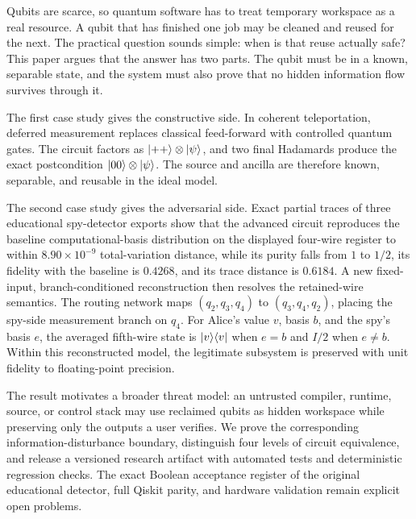 Qubits are scarce, so quantum software has to treat temporary workspace as a
real resource. A qubit that has finished one job may be cleaned and reused for
the next. The practical question sounds simple: when is that reuse actually
safe? This paper argues that the answer has two parts. The qubit must be in a
known, separable state, and the system must also prove that no hidden
information flow survives through it.

The first case study gives the constructive side. In coherent teleportation,
deferred measurement replaces classical feed-forward with controlled quantum
gates. The circuit factors as
$\ket{++}\otimes\ket{\psi}$, and two final Hadamards produce the exact
postcondition $\ket{00}\otimes\ket{\psi}$. The source and ancilla are therefore
known, separable, and reusable in the ideal model.

The second case study gives the adversarial side. Exact partial traces of three
educational spy-detector exports show that the advanced circuit reproduces the
baseline computational-basis distribution on the displayed four-wire register
to within $8.90\times10^{-9}$ total-variation distance, while its purity falls
from $1$ to $1/2$, its fidelity with the baseline is $0.4268$, and its trace
distance is $0.6184$. A new fixed-input, branch-conditioned reconstruction then
resolves the retained-wire semantics. The routing network maps
$(q_2,q_3,q_4)$ to $(q_3,q_4,q_2)$, placing the spy-side measurement branch on
$q_4$. For Alice's value $v$, basis $b$, and the spy's basis $e$, the averaged
fifth-wire state is $\ket{v}\!\bra{v}$ when $e=b$ and $I/2$ when $e\neq b$.
Within this reconstructed model, the legitimate subsystem is preserved with
unit fidelity to floating-point precision.

The result motivates a broader threat model: an untrusted compiler, runtime,
source, or control stack may use reclaimed qubits as hidden workspace while
preserving only the outputs a user verifies. We prove the corresponding
information-disturbance boundary, distinguish four levels of circuit
equivalence, and release a versioned research artifact with automated tests and
deterministic regression checks. The exact Boolean acceptance register of the
original educational detector, full Qiskit parity, and hardware validation
remain explicit open problems.

